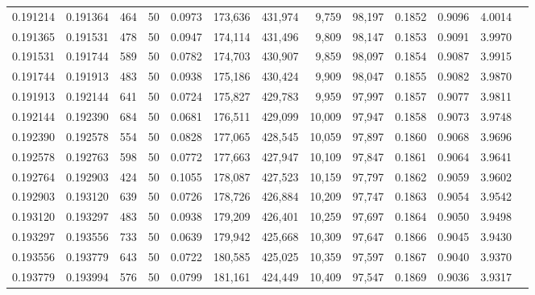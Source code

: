 \begin{tabular}{rrrrrrrrrrrrr}
0.191214 & 0.191364 &   464 &  50 &                                     0.0973 & 173,636 & 431,974 &   9,759 &  98,197 & 0.1852 & 0.9096 & 4.0014 \\
0.191365 & 0.191531 &   478 &  50 &                                     0.0947 & 174,114 & 431,496 &   9,809 &  98,147 & 0.1853 & 0.9091 & 3.9970 \\
0.191531 & 0.191744 &   589 &  50 &                                     0.0782 & 174,703 & 430,907 &   9,859 &  98,097 & 0.1854 & 0.9087 & 3.9915 \\
0.191744 & 0.191913 &   483 &  50 &                                     0.0938 & 175,186 & 430,424 &   9,909 &  98,047 & 0.1855 & 0.9082 & 3.9870 \\
0.191913 & 0.192144 &   641 &  50 &                                     0.0724 & 175,827 & 429,783 &   9,959 &  97,997 & 0.1857 & 0.9077 & 3.9811 \\
0.192144 & 0.192390 &   684 &  50 &                                     0.0681 & 176,511 & 429,099 &  10,009 &  97,947 & 0.1858 & 0.9073 & 3.9748 \\
0.192390 & 0.192578 &   554 &  50 &                                     0.0828 & 177,065 & 428,545 &  10,059 &  97,897 & 0.1860 & 0.9068 & 3.9696 \\
0.192578 & 0.192763 &   598 &  50 &                                     0.0772 & 177,663 & 427,947 &  10,109 &  97,847 & 0.1861 & 0.9064 & 3.9641 \\
0.192764 & 0.192903 &   424 &  50 &                                     0.1055 & 178,087 & 427,523 &  10,159 &  97,797 & 0.1862 & 0.9059 & 3.9602 \\
0.192903 & 0.193120 &   639 &  50 &                                     0.0726 & 178,726 & 426,884 &  10,209 &  97,747 & 0.1863 & 0.9054 & 3.9542 \\
0.193120 & 0.193297 &   483 &  50 &                                     0.0938 & 179,209 & 426,401 &  10,259 &  97,697 & 0.1864 & 0.9050 & 3.9498 \\
0.193297 & 0.193556 &   733 &  50 &                                     0.0639 & 179,942 & 425,668 &  10,309 &  97,647 & 0.1866 & 0.9045 & 3.9430 \\
0.193556 & 0.193779 &   643 &  50 &                                     0.0722 & 180,585 & 425,025 &  10,359 &  97,597 & 0.1867 & 0.9040 & 3.9370 \\
0.193779 & 0.193994 &   576 &  50 &                                     0.0799 & 181,161 & 424,449 &  10,409 &  97,547 & 0.1869 & 0.9036 & 3.9317 \\

\end{tabular}
